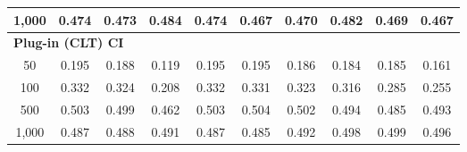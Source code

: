 \documentclass{article}
\numberwithin{equation}{section}
\begin{document}
\begin{table}[ht]
\begin{tabular}{c|ccc|cccccc}
1{,}000
& \cellcolor{covheat!87!white}0.474 & \cellcolor{covheat!86!white}0.473 & \cellcolor{covheat!92!white}0.484
& \cellcolor{covheat!87!white}0.474 & \cellcolor{covheat!84!white}0.467 & \cellcolor{covheat!85!white}0.470 & \cellcolor{covheat!91!white}0.482 & \cellcolor{covheat!84!white}0.469 & \cellcolor{covheat!84!white}0.467 \\
\hline
\multicolumn{10}{l}{\textbf{Plug-in (CLT) CI}} \\ \hline
50
& 0.195 & 0.188 & 0.119
& 0.195 & 0.195 & 0.186 & 0.184 & 0.185 & 0.161 \\
100
& \cellcolor{covheat!16!white}0.332 & \cellcolor{covheat!12!white}0.324 & 0.208
& \cellcolor{covheat!16!white}0.332 & \cellcolor{covheat!16!white}0.331 & \cellcolor{covheat!12!white}0.323 & \cellcolor{covheat!8!white}0.316 & 0.285 & 0.255 \\
500
& \cellcolor{covheat!100!white}0.503 & \cellcolor{covheat!100!white}0.499 & \cellcolor{covheat!81!white}0.462
& \cellcolor{covheat!100!white}0.503 & \cellcolor{covheat!100!white}0.504 & \cellcolor{covheat!100!white}0.502 & \cellcolor{covheat!97!white}0.494 & \cellcolor{covheat!92!white}0.485 & \cellcolor{covheat!96!white}0.493 \\
1{,}000
& \cellcolor{covheat!94!white}0.487 & \cellcolor{covheat!94!white}0.488 & \cellcolor{covheat!96!white}0.491
& \cellcolor{covheat!94!white}0.487 & \cellcolor{covheat!92!white}0.485 & \cellcolor{covheat!96!white}0.492 & \cellcolor{covheat!99!white}0.498 & \cellcolor{covheat!100!white}0.499 & \cellcolor{covheat!98!white}0.496 \\
\hline
\end{tabular}
\end{table}
\end{document}
